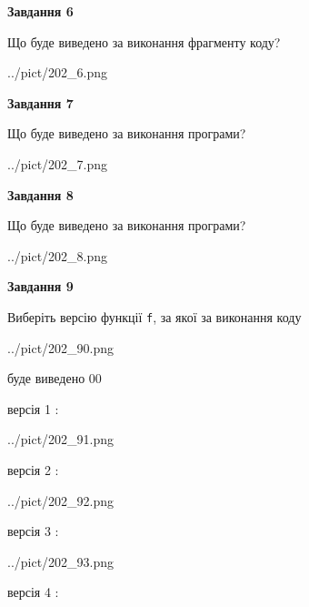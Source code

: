 \documentclass[12pt, ukrainian]{article}
\def\code#1{\Verb!#1!}
\begin{document}
{\begin {large}
{\begin {center}\textbf{Завдання 6}\end {center}}

Що буде виведено за виконання фрагменту коду?\par
\begin{center}
	{../pict/202_6.png}
\end{center}
\newpage

{\begin {center}\textbf{Завдання 7}\end {center}}

Що буде виведено за виконання програми?\par
\begin{center}
	{../pict/202_7.png}
\end{center}
\newpage

{\begin {center}\textbf{Завдання 8}\end {center}}

Що буде виведено за виконання програми?\par
\begin{center}
	{../pict/202_8.png}
\end{center}
\newpage

{\begin {center}\textbf{Завдання 9}\end {center}}

Виберіть версію функції \code{f}, за якої за виконання коду
\begin{center}
	{../pict/202_90.png}
\end{center}
буде виведено 00

\vspace{5mm}
версія 1 :

\begin{center}
	{../pict/202_91.png}
\end{center}
версія 2 :

\begin{center}
	{../pict/202_92.png}
\end{center}
версія 3 :

\begin{center}
	{../pict/202_93.png}
\end{center}
версія 4 :


\end{large}}
\end{document}
